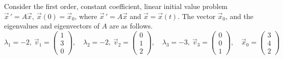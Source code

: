 \ifnum {}
\question[10] Consider the first order, constant coefficient, linear initial value problem $\vec x \, ' = A\vec x, \ \vec x (0) = \vec x_0$, where $\vec x \, ' = A\vec x$ and $\vec x = \vec x(t)$. The vector $\vec x_0$, and the eigenvalues and eigenvectors of $A$ are as follows. 
$$\lambda_1 = -2, \ \vec v_1 = \begin{pmatrix}1\\3\\0 \end{pmatrix} , \quad \lambda_2 = -2, \ \vec v_2 = \begin{pmatrix} 0\\1\\2 \end{pmatrix}, \quad \lambda_3 = -3, \ \vec v_3 = \begin{pmatrix} 0\\0\\1\end{pmatrix}, \quad \vec x_0 = \begin{pmatrix} 3\\4\\2\end{pmatrix}$$
